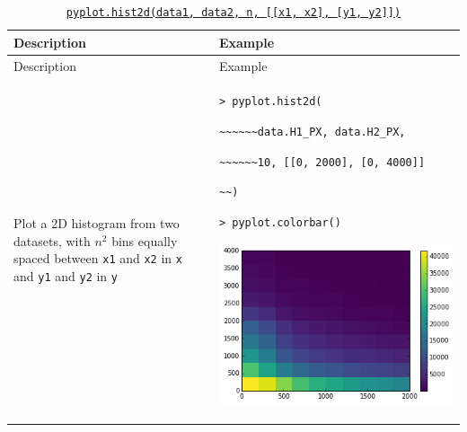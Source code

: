 \documentclass[10pt,a4paperpaper,]{article}
\begin{document}
\begin{longtable}[]{@{}ll@{}}
\caption{\href{http://matplotlib.org/api/pyplot_api.html\#matplotlib.pyplot.hist2d}{\texttt{pyplot.hist2d(data1,\ data2,\ n,\ {[}{[}x1,\ x2{]},\ {[}y1,\ y2{]}{]})}}}\tabularnewline
\toprule
\begin{minipage}[b]{0.47\columnwidth}\raggedright\strut
Description
\strut\end{minipage} &
\begin{minipage}[b]{0.47\columnwidth}\raggedright\strut
Example
\strut\end{minipage}\tabularnewline
\midrule
\endfirsthead
\toprule
\begin{minipage}[b]{0.47\columnwidth}\raggedright\strut
Description
\strut\end{minipage} &
\begin{minipage}[b]{0.47\columnwidth}\raggedright\strut
Example
\strut\end{minipage}\tabularnewline
\midrule
\endhead
\begin{minipage}[t]{0.47\columnwidth}\raggedright\strut
Plot a 2D histogram from two datasets, with \(n^2\) bins equally spaced
between \texttt{x1} and \texttt{x2} in \texttt{x} and \texttt{y1} and
\texttt{y2} in \texttt{y}
\strut\end{minipage} &
\begin{minipage}[t]{0.47\columnwidth}\raggedright\strut
\texttt{\textgreater{}\ pyplot.hist2d(}

\texttt{\textasciitilde{}\textasciitilde{}\textasciitilde{}\textasciitilde{}\textasciitilde{}\textasciitilde{}data.H1\_PX,\ data.H2\_PX,}

\texttt{\textasciitilde{}\textasciitilde{}\textasciitilde{}\textasciitilde{}\textasciitilde{}\textasciitilde{}10,\ {[}{[}0,\ 2000{]},\ {[}0,\ 4000{]}{]}}

\texttt{\textasciitilde{}\textasciitilde{})}

\texttt{\textgreater{}\ pyplot.colorbar()}

\includegraphics[width=\textwidth]{assets/02-hist2d.png}
\strut\end{minipage}\tabularnewline
\bottomrule
\end{longtable}
\end{document}
